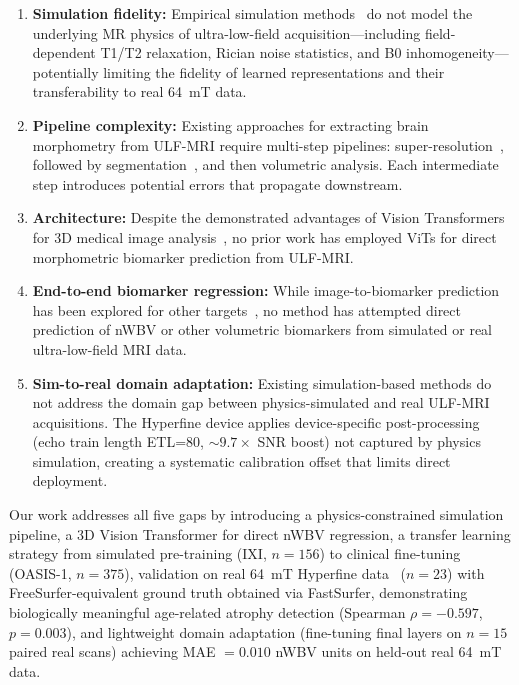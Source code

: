 \begin{enumerate}
    \item \textbf{Simulation fidelity:} Empirical simulation methods~\cite{arnold2022simulated, javadi2025diffusion, minocha2024lowfieldad} do not model the underlying MR physics of ultra-low-field acquisition---including field-dependent T1/T2 relaxation, Rician noise statistics, and B0 inhomogeneity---potentially limiting the fidelity of learned representations and their transferability to real 64~mT data.

    \item \textbf{Pipeline complexity:} Existing approaches for extracting brain morphometry from ULF-MRI require multi-step pipelines: super-resolution~\cite{baljer2025pediatricsr, iglesias2023synthsr}, followed by segmentation~\cite{billot2023synthseg}, and then volumetric analysis. Each intermediate step introduces potential errors that propagate downstream.

    \item \textbf{Architecture:} Despite the demonstrated advantages of Vision Transformers for 3D medical image analysis~\cite{hatamizadeh2022unetr, wang2021transbts, tang2022swinunetr}, no prior work has employed ViTs for direct morphometric biomarker prediction from ULF-MRI.

    \item \textbf{End-to-end biomarker regression:} While image-to-biomarker prediction has been explored for other targets~\cite{hasegawa2025biomarker}, no method has attempted direct prediction of nWBV or other volumetric biomarkers from simulated or real ultra-low-field MRI data.

    \item \textbf{Sim-to-real domain adaptation:} Existing simulation-based methods do not address the domain gap between physics-simulated and real ULF-MRI acquisitions. The Hyperfine device applies device-specific post-processing (echo train length ETL=80, ${\sim}9.7\times$ SNR boost) not captured by physics simulation, creating a systematic calibration offset that limits direct deployment.
\end{enumerate}

Our work addresses all five gaps by introducing a physics-constrained simulation pipeline, a 3D Vision Transformer for direct nWBV regression, a transfer learning strategy from simulated pre-training (IXI, $n = 156$) to clinical fine-tuning (OASIS-1, $n = 375$), validation on real 64~mT Hyperfine data~\cite{vasa2025morphometry} ($n = 23$) with FreeSurfer-equivalent ground truth obtained via FastSurfer, demonstrating biologically meaningful age-related atrophy detection (Spearman $\rho = -0.597$, $p = 0.003$), and lightweight domain adaptation (fine-tuning final layers on $n = 15$ paired real scans) achieving MAE $= 0.010$ nWBV units on held-out real 64~mT data.

